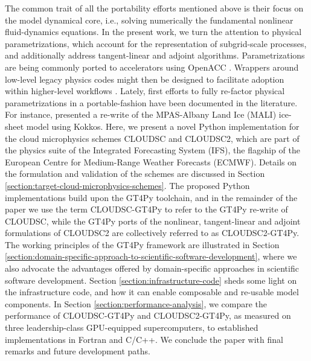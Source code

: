 \documentclass[../main.tex]{subfiles}
\begin{document}
    The common trait of all the portability efforts mentioned above is their focus on the model dynamical core, i.e., solving numerically the fundamental nonlinear fluid-dynamics equations. In the present work, we turn the attention to physical parametrizations, which account for the representation of subgrid-scale processes, and additionally address tangent-linear and adjoint algorithms. Parametrizations are being commonly ported to accelerators using OpenACC \citep[e.g., ][]{fuhrer14, yang19, kim21}. Wrappers around low-level legacy physics codes might then be designed to facilitate adoption within higher-level workflows \citep{monteiro18, mcgibbon21}. Lately, first efforts to fully re-factor physical parametrizations in a portable-fashion have been documented in the literature. For instance, \citet{watkins23} presented a re-write of the MPAS-Albany Land Ice (MALI) ice-sheet model using Kokkos. Here, we present a novel Python implementation for the cloud microphysics schemes CLOUDSC and CLOUDSC2, which are part of the physics suite of the Integrated Forecasting System (IFS), the flagship of the European Centre for Medium-Range Weather Forecasts (ECMWF). Details on the formulation and validation of the schemes are discussed in Section \ref{section:target-cloud-microphysics-schemes}. The proposed Python implementations build upon the GT4Py toolchain, and in the remainder of the paper we use the term CLOUDSC-GT4Py to refer to the GT4Py re-write of CLOUDSC, while the GT4Py ports of the nonlinear, tangent-linear and adjoint formulations of CLOUDSC2 are collectively referred to as CLOUDSC2-GT4Py. The working principles of the GT4Py framework are illustrated in Section \ref{section:domain-specific-approach-to-scientific-software-development}, where we also advocate the advantages offered by domain-specific approaches in scientific software development. Section \ref{section:infrastructure-code} sheds some light on the infrastructure code, and how it can enable composable and re-usable model components. In Section \ref{section:performance-analysis}, we compare the performance of CLOUDSC-GT4Py and CLOUDSC2-GT4Py, as measured on three leadership-class GPU-equipped supercomputers, to established implementations in Fortran and C/C++. We conclude the paper with final remarks and future development paths.

    \biblio
\end{document}

